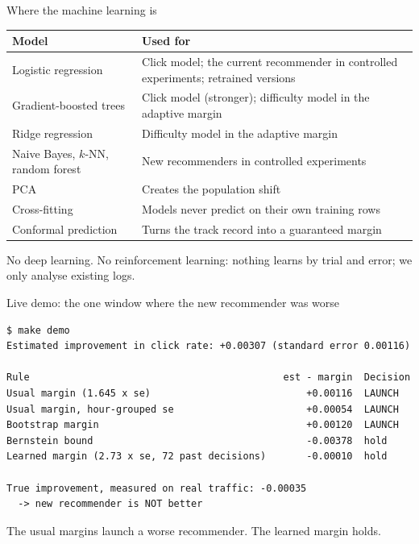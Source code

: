 \documentclass[aspectratio=169,11pt]{beamer}
\begin{document}
\begin{frame}{Where the machine learning is}
\small
\begin{tabular}{p{}p{}}
\toprule
Model & Used for \\
\midrule
Logistic regression & Click model; the current recommender in controlled experiments; retrained versions \\
Gradient-boosted trees & Click model (stronger); difficulty model in the adaptive margin \\
Ridge regression & Difficulty model in the adaptive margin \\
Naive Bayes, $k$-NN, random forest & New recommenders in controlled experiments \\
PCA & Creates the population shift \\
Cross-fitting & Models never predict on their own training rows \\
Conformal prediction & Turns the track record into a guaranteed margin \\
\bottomrule
\end{tabular}
\vspace{0.5em}

No deep learning. No reinforcement learning: nothing learns by trial and error; we only analyse existing logs.
\end{frame}

\begin{frame}[fragile]{Live demo: the one window where the new recommender was worse}
\scriptsize
\begin{verbatim}
$ make demo
Estimated improvement in click rate: +0.00307 (standard error 0.00116)

Rule                                            est - margin  Decision
Usual margin (1.645 x se)                           +0.00116  LAUNCH
Usual margin, hour-grouped se                       +0.00054  LAUNCH
Bootstrap margin                                    +0.00120  LAUNCH
Bernstein bound                                     -0.00378  hold
Learned margin (2.73 x se, 72 past decisions)       -0.00010  hold

True improvement, measured on real traffic: -0.00035
  -> new recommender is NOT better
\end{verbatim}
\normalsize
The usual margins launch a worse recommender. The learned margin holds.
\end{frame}
\end{document}
